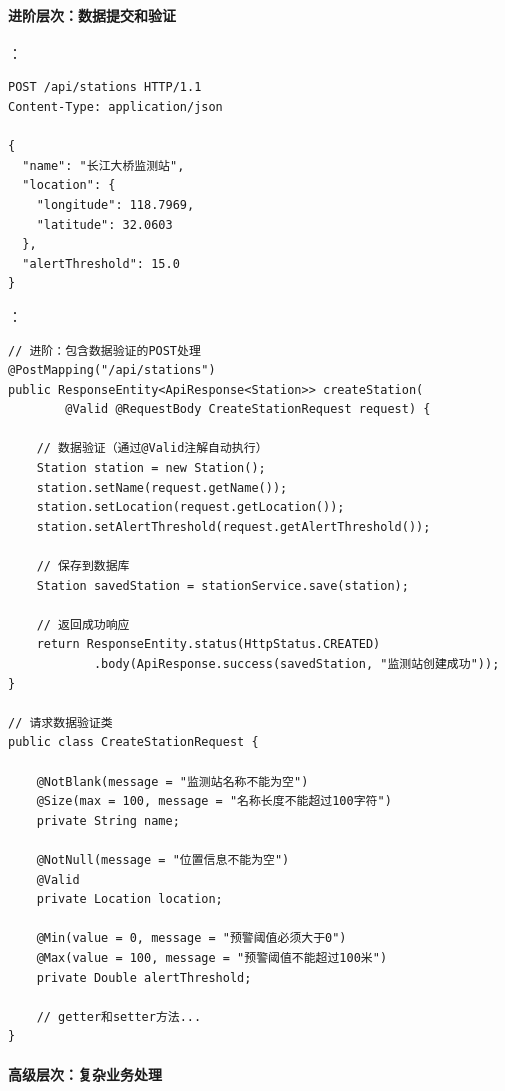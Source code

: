\hypertarget{ux8fdbux9636ux5c42ux6b21ux6570ux636eux63d0ux4ea4ux548cux9a8cux8bc1}{%
\paragraph{进阶层次：数据提交和验证}\label{ux8fdbux9636ux5c42ux6b21ux6570ux636eux63d0ux4ea4ux548cux9a8cux8bc1}}

：

\begin{lstlisting}
POST /api/stations HTTP/1.1
Content-Type: application/json

{
  "name": "长江大桥监测站",
  "location": {
    "longitude": 118.7969,
    "latitude": 32.0603
  },
  "alertThreshold": 15.0
}
\end{lstlisting}

：

\begin{lstlisting}[style=java]
// 进阶：包含数据验证的POST处理
@PostMapping("/api/stations")
public ResponseEntity<ApiResponse<Station>> createStation(
        @Valid @RequestBody CreateStationRequest request) {
    
    // 数据验证（通过@Valid注解自动执行）
    Station station = new Station();
    station.setName(request.getName());
    station.setLocation(request.getLocation());
    station.setAlertThreshold(request.getAlertThreshold());
    
    // 保存到数据库
    Station savedStation = stationService.save(station);
    
    // 返回成功响应
    return ResponseEntity.status(HttpStatus.CREATED)
            .body(ApiResponse.success(savedStation, "监测站创建成功"));
}

// 请求数据验证类
public class CreateStationRequest {
    
    @NotBlank(message = "监测站名称不能为空")
    @Size(max = 100, message = "名称长度不能超过100字符")
    private String name;
    
    @NotNull(message = "位置信息不能为空")
    @Valid
    private Location location;
    
    @Min(value = 0, message = "预警阈值必须大于0")
    @Max(value = 100, message = "预警阈值不能超过100米")
    private Double alertThreshold;
    
    // getter和setter方法...
}
\end{lstlisting}

\hypertarget{ux9ad8ux7ea7ux5c42ux6b21ux590dux6742ux4e1aux52a1ux5904ux7406}{%
\paragraph{高级层次：复杂业务处理}\label{ux9ad8ux7ea7ux5c42ux6b21ux590dux6742ux4e1aux52a1ux5904ux7406}}

